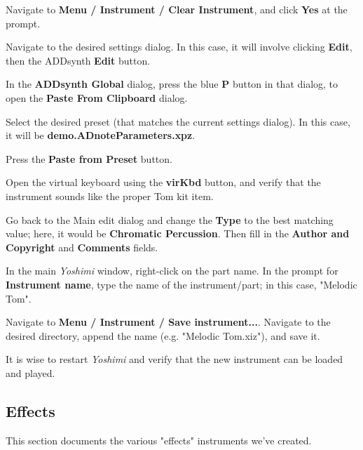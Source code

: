       \begin{enumber}
         \item Navigate to \textbf{Menu / Instrument / Clear Instrument}, and
            click \textbf{Yes} at the prompt.
         \item Navigate to the desired settings dialog.  In this case, it
            will involve clicking \textbf{Edit}, then the ADDsynth
            \textbf{Edit} button.
         \item In the \textbf{ADDsynth Global} dialog,
            press the blue \textbf{P} button in that dialog,
            to open the \textbf{Paste From Clipboard} dialog.
         \item Select the desired preset (that matches the current settings
            dialog).  In this case, it will be
            \textbf{demo.ADnoteParameters.xpz}.
         \item Press the \textbf{Paste from Preset} button.
         \item Open the virtual keyboard using the \textbf{virKbd} button,
            and verify that the instrument sounds like the proper Tom kit
            item.
         \item Go back to the Main edit dialog and change the \textbf{Type}
            to the best matching value; here, it would be
            \textbf{Chromatic Percussion}.  Then fill in the
            \textbf{Author and Copyright} and \textbf{Comments} fields.
         \item In the main \textsl{Yoshimi} window, right-click on the part
            name.  In the prompt for \textbf{Instrument name}, type the name
            of the instrument/part; in this case, "Melodic Tom".
         \item Navigate to
            \textbf{Menu / Instrument / Save instrument...}.
            Navigate to the desired directory, append the name (e.g.
            "Melodic Tom.xiz"), and save it.
      \end{enumber}

   It is wise to restart \textsl{Yoshimi} and verify that the new instrument
   can be loaded and played.

\subsection{Effects}
\label{subsec:cookbook_instruments_effects}

   This section documents the various "effects" instruments we've created.

